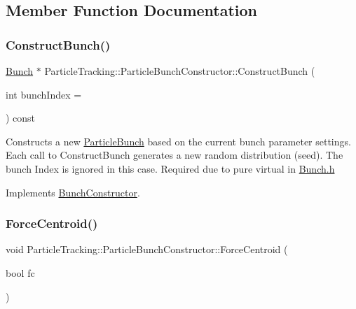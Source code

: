 \subsection{Member Function Documentation}
\mbox{\label{classParticleTracking_1_1ParticleBunchConstructor_aebe4d8d199000312012024ff73b71ec2}} 
\subsubsection{\texorpdfstring{Construct\+Bunch()}{ConstructBunch()}}
{\footnotesize\ttfamily \hyperlink{classBunch}{Bunch} $\ast$ Particle\+Tracking\+::\+Particle\+Bunch\+Constructor\+::\+Construct\+Bunch (\begin{DoxyParamCaption}\item[{int}]{bunch\+Index = {} }\end{DoxyParamCaption}) const\hspace{0.3cm}{\ttfamily [virtual]}}

Constructs a new \hyperlink{classParticleTracking_1_1ParticleBunch}{Particle\+Bunch} based on the current bunch parameter settings. Each call to Construct\+Bunch generates a new random distribution (seed). The bunch Index is ignored in this case. Required due to pure virtual in \hyperlink{Bunch_8h_source}{Bunch.\+h} 

Implements \hyperlink{classBunchConstructor}{Bunch\+Constructor}.

\mbox{\label{classParticleTracking_1_1ParticleBunchConstructor_ab451ce643161911314a6d72ad564467d}} 
\subsubsection{\texorpdfstring{Force\+Centroid()}{ForceCentroid()}}
{\footnotesize\ttfamily void Particle\+Tracking\+::\+Particle\+Bunch\+Constructor\+::\+Force\+Centroid (\begin{DoxyParamCaption}\item[{bool}]{fc }\end{DoxyParamCaption})}

